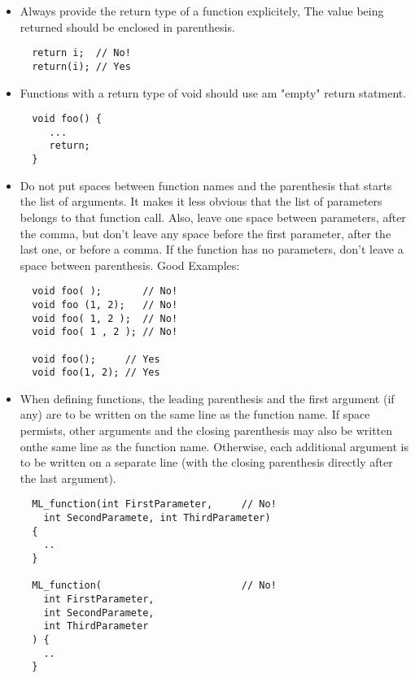 \documentclass[10pt,letter,relax]{SANDreport}
\begin{document}
\begin{itemize}
\item Always provide the return type of a function explicitely, The value
  being returned should be enclosed in parenthesis.
  \begin{verbatim}
  return i;  // No!
  return(i); // Yes
  \end{verbatim}
\item Functions with a return type of void should use am "empty" return
  statment.
  \begin{verbatim}
  void foo() {
     ...
     return;
  }
  \end{verbatim}
\item Do not put spaces between function names and the parenthesis that
  starts the list of arguments. It makes it less obvious that the list
  of parameters belongs to that function call. Also, leave one space
  between parameters, after the comma, but don't leave any space before
  the first parameter, after the last one, or before a comma. If the
  function has no parameters, don't leave a space between parenthesis.
  Good Examples:
  \begin{verbatim}
  void foo( );       // No!
  void foo (1, 2);   // No!
  void foo( 1, 2 );  // No!
  void foo( 1 , 2 ); // No!

  void foo();     // Yes
  void foo(1, 2); // Yes
  \end{verbatim}

\item When defining functions, the leading parenthesis and the first argument
  (if any) are to be written on the same line as the function name. If space
  permists, other arguments and the closing parenthesis may also be written
  onthe same line as the function name. Otherwise, each additional argument is
  to be written on a separate line (with the closing parenthesis directly
                                    after the last argument).

  \begin{verbatim}
  ML_function(int FirstParameter,     // No!
    int SecondParamete, int ThirdParameter)
  {
    ..
  }

  ML_function(                        // No!
    int FirstParameter,
    int SecondParamete,
    int ThirdParameter
  ) {
    ..
  }    


\end{verbatim}
\end{itemize}
\end{document}
